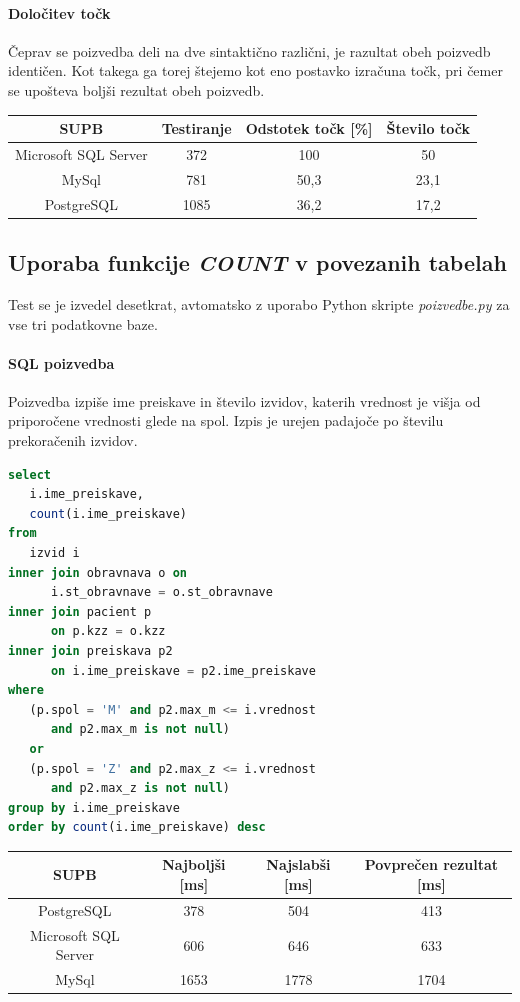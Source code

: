 \documentclass[a4paper,11pt]{report}
\begin{document}
\paragraph{Določitev točk} Čeprav se poizvedba deli na dve sintaktično različni, je razultat obeh poizvedb identičen. Kot takega
ga torej štejemo kot eno postavko izračuna točk, pri čemer se upošteva boljši rezultat obeh poizvedb.

\begin{center}
   \begin{tabular}{||c|c|c|c||}
      \hline
      \textbf{SUPB} & \textbf{Testiranje} & \textbf{Odstotek točk [\%]} & \textbf{Število točk}\\
      \hline
      \hline
      Microsoft SQL Server & 372 & 100 & 50 \\
      MySql & 781 & 50,3 & 23,1 \\
      PostgreSQL & 1085 & 36,2 & 17,2\\
      \hline
   \end{tabular}
\end{center}

\subsection{Uporaba funkcije \textit{COUNT} v povezanih tabelah}
Test se je izvedel desetkrat, avtomatsko z uporabo Python skripte \textit{poizvedbe.py} za vse tri podatkovne baze.

\paragraph{SQL poizvedba}
Poizvedba izpiše ime preiskave in število izvidov, katerih vrednost je višja od priporočene vrednosti glede na spol.
Izpis je urejen padajoče po številu prekoračenih izvidov.
\begin{lstlisting}[language = SQL]
select
   i.ime_preiskave,
   count(i.ime_preiskave)
from
   izvid i
inner join obravnava o on 
      i.st_obravnave = o.st_obravnave
inner join pacient p 
      on p.kzz = o.kzz
inner join preiskava p2 
      on i.ime_preiskave = p2.ime_preiskave
where
   (p.spol = 'M' and p2.max_m <= i.vrednost 
      and p2.max_m is not null) 
   or
   (p.spol = 'Z' and p2.max_z <= i.vrednost 
      and p2.max_z is not null)
group by i.ime_preiskave
order by count(i.ime_preiskave) desc
\end{lstlisting}

\begin{center}
   \begin{tabular}{||c|c|c|c||}
      \hline
      \textbf{SUPB} & \textbf{Najboljši [ms]} & \textbf{Najslabši [ms]} & \textbf{Povprečen rezultat [ms]}\\
      \hline
      \hline
      PostgreSQL & 378 & 504 & 413 \\
      Microsoft SQL Server & 606 & 646 & 633 \\
      MySql & 1653 & 1778 & 1704\\
      \hline
   \end{tabular}
\end{center}
\end{document}
